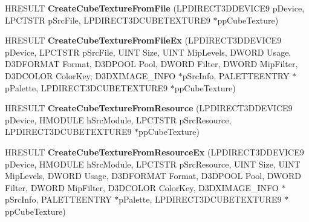\begin{DoxyCompactItemize}
\item 
\hypertarget{class_c_d_x_u_t_resource_cache_ac81b19e2dfca7f4ef542425007b6cfc8}{H\+R\+E\+S\+U\+L\+T {\bfseries Create\+Cube\+Texture\+From\+File} (L\+P\+D\+I\+R\+E\+C\+T3\+D\+D\+E\+V\+I\+C\+E9 p\+Device, L\+P\+C\+T\+S\+T\+R p\+Src\+File, L\+P\+D\+I\+R\+E\+C\+T3\+D\+C\+U\+B\+E\+T\+E\+X\+T\+U\+R\+E9 $\ast$pp\+Cube\+Texture)}\label{class_c_d_x_u_t_resource_cache_ac81b19e2dfca7f4ef542425007b6cfc8}

\item 
\hypertarget{class_c_d_x_u_t_resource_cache_a3c03e924cfd9af63363f5976f266c14e}{H\+R\+E\+S\+U\+L\+T {\bfseries Create\+Cube\+Texture\+From\+File\+Ex} (L\+P\+D\+I\+R\+E\+C\+T3\+D\+D\+E\+V\+I\+C\+E9 p\+Device, L\+P\+C\+T\+S\+T\+R p\+Src\+File, U\+I\+N\+T Size, U\+I\+N\+T Mip\+Levels, D\+W\+O\+R\+D Usage, D3\+D\+F\+O\+R\+M\+A\+T Format, D3\+D\+P\+O\+O\+L Pool, D\+W\+O\+R\+D Filter, D\+W\+O\+R\+D Mip\+Filter, D3\+D\+C\+O\+L\+O\+R Color\+Key, D3\+D\+X\+I\+M\+A\+G\+E\+\_\+\+I\+N\+F\+O $\ast$p\+Src\+Info, P\+A\+L\+E\+T\+T\+E\+E\+N\+T\+R\+Y $\ast$p\+Palette, L\+P\+D\+I\+R\+E\+C\+T3\+D\+C\+U\+B\+E\+T\+E\+X\+T\+U\+R\+E9 $\ast$pp\+Cube\+Texture)}\label{class_c_d_x_u_t_resource_cache_a3c03e924cfd9af63363f5976f266c14e}

\item 
\hypertarget{class_c_d_x_u_t_resource_cache_a778a88f6051a949abb95dc1923c13b83}{H\+R\+E\+S\+U\+L\+T {\bfseries Create\+Cube\+Texture\+From\+Resource} (L\+P\+D\+I\+R\+E\+C\+T3\+D\+D\+E\+V\+I\+C\+E9 p\+Device, H\+M\+O\+D\+U\+L\+E h\+Src\+Module, L\+P\+C\+T\+S\+T\+R p\+Src\+Resource, L\+P\+D\+I\+R\+E\+C\+T3\+D\+C\+U\+B\+E\+T\+E\+X\+T\+U\+R\+E9 $\ast$pp\+Cube\+Texture)}\label{class_c_d_x_u_t_resource_cache_a778a88f6051a949abb95dc1923c13b83}

\item 
\hypertarget{class_c_d_x_u_t_resource_cache_afdf53d69820d5c0f5f9af4d7b51bd81a}{H\+R\+E\+S\+U\+L\+T {\bfseries Create\+Cube\+Texture\+From\+Resource\+Ex} (L\+P\+D\+I\+R\+E\+C\+T3\+D\+D\+E\+V\+I\+C\+E9 p\+Device, H\+M\+O\+D\+U\+L\+E h\+Src\+Module, L\+P\+C\+T\+S\+T\+R p\+Src\+Resource, U\+I\+N\+T Size, U\+I\+N\+T Mip\+Levels, D\+W\+O\+R\+D Usage, D3\+D\+F\+O\+R\+M\+A\+T Format, D3\+D\+P\+O\+O\+L Pool, D\+W\+O\+R\+D Filter, D\+W\+O\+R\+D Mip\+Filter, D3\+D\+C\+O\+L\+O\+R Color\+Key, D3\+D\+X\+I\+M\+A\+G\+E\+\_\+\+I\+N\+F\+O $\ast$p\+Src\+Info, P\+A\+L\+E\+T\+T\+E\+E\+N\+T\+R\+Y $\ast$p\+Palette, L\+P\+D\+I\+R\+E\+C\+T3\+D\+C\+U\+B\+E\+T\+E\+X\+T\+U\+R\+E9 $\ast$pp\+Cube\+Texture)}\label{class_c_d_x_u_t_resource_cache_afdf53d69820d5c0f5f9af4d7b51bd81a}


\end{DoxyCompactItemize}
